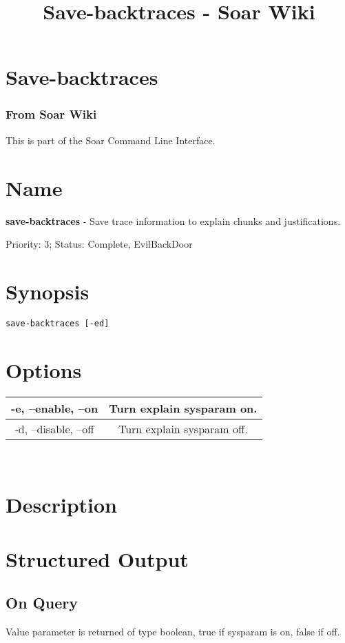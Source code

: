 \documentclass[10pt]{article}
\title{Save-backtraces - Soar Wiki}
\begin{document}
\section*{Save-backtraces}
\subsubsection*{From Soar Wiki}


 This is part of the Soar Command Line Interface. 
\section*{ Name }


 \textbf{save-backtraces}
 - Save trace information to explain chunks and justifications. 


 Priority: 3; Status: Complete, EvilBackDoor
\section*{ Synopsis }
\begin{verbatim}
save-backtraces [-ed]

\end{verbatim}
\section*{ Options }


\begin{tabular}{|c|c|}
\hline 
 -e, --enable, --on  & Turn explain sysparam on.  \\
 \hline 
 -d, --disable, --off  & Turn explain sysparam off.  \\
 \hline 

\end{tabular}



 \\ 

\section*{ Description }
\section*{ Structured Output }
\subsection*{ On Query }


 Value parameter is returned of type boolean, true if sysparam is on, false if off. 
\end{document}
